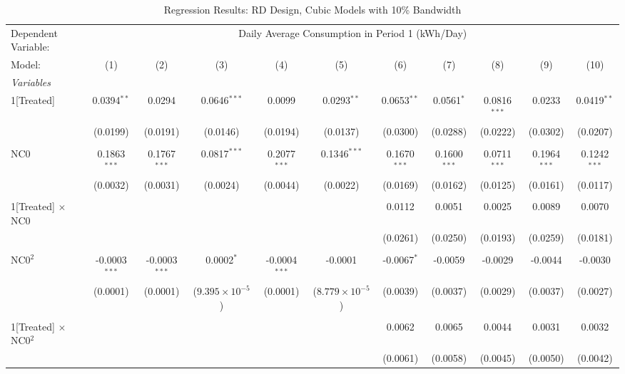 \begin{table}[htbp]
\centering
\caption{\label{Table:Regression-Results_RD_Cubic_BW-10} Regression Results: RD Design, Cubic Models with 10\% Bandwidth}
\begin{adjustbox}{scale = 0.65}
\begin{tabular}{lcccccccccc}
\tabularnewline\toprule\toprule
Dependent Variable:&\multicolumn{10}{c}{Daily Average Consumption in Period 1 (kWh/Day)}\\
Model:&(1) & (2) & (3) & (4) & (5) & (6) & (7) & (8) & (9) & (10)\\
\midrule
\emph{Variables}&   &   &   &   &   &   &   &   &   &  \\
1[Treated]&0.0394$^{**}$ & 0.0294 & 0.0646$^{***}$ & 0.0099 & 0.0293$^{**}$ & 0.0653$^{**}$ & 0.0561$^{*}$ & 0.0816$^{***}$ & 0.0233 & 0.0419$^{**}$\\
  &(0.0199) & (0.0191) & (0.0146) & (0.0194) & (0.0137) & (0.0300) & (0.0288) & (0.0222) & (0.0302) & (0.0207)\\
&   &   &   &   &   &   &   &   &   &  \\
NC0&0.1863$^{***}$ & 0.1767$^{***}$ & 0.0817$^{***}$ & 0.2077$^{***}$ & 0.1346$^{***}$ & 0.1670$^{***}$ & 0.1600$^{***}$ & 0.0711$^{***}$ & 0.1964$^{***}$ & 0.1242$^{***}$\\
  &(0.0032) & (0.0031) & (0.0024) & (0.0044) & (0.0022) & (0.0169) & (0.0162) & (0.0125) & (0.0161) & (0.0117)\\
&   &   &   &   &   &   &   &   &   &  \\
1[Treated] $\times $ NC0&   &    &    &    &    & 0.0112 & 0.0051 & 0.0025 & 0.0089 & 0.0070\\
  &   &    &    &    &    & (0.0261) & (0.0250) & (0.0193) & (0.0259) & (0.0181)\\
&   &   &   &   &   &   &   &   &   &  \\
NC0$^2$&-0.0003$^{***}$ & -0.0003$^{***}$ & 0.0002$^{*}$ & -0.0004$^{***}$ & -0.0001 & -0.0067$^{*}$ & -0.0059 & -0.0029 & -0.0044 & -0.0030\\
  &(0.0001) & (0.0001) & ($9.395\times 10^{-5}$) & (0.0001) & ($8.779\times 10^{-5}$) & (0.0039) & (0.0037) & (0.0029) & (0.0037) & (0.0027)\\
&   &   &   &   &   &   &   &   &   &  \\
1[Treated] $\times $ NC0$^2$&   &    &    &    &    & 0.0062 & 0.0065 & 0.0044 & 0.0031 & 0.0032\\
  &   &    &    &    &    & (0.0061) & (0.0058) & (0.0045) & (0.0050) & (0.0042)\\

\end{tabular}
\end{adjustbox}
\end{table}
